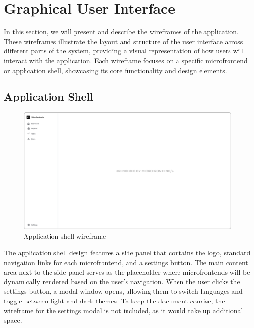 \section{Graphical User Interface}
In this section, we will present and describe the wireframes of the application. These wireframes illustrate the layout and structure of the user interface across different parts of the system, providing a visual representation of how users will interact with the application. Each wireframe focuses on a specific microfrontend or application shell, showcasing its core functionality and design elements.
\subsection{Application Shell}
\begin{figure}[h]
\centerline{\includegraphics[width=1\textwidth]{images/wireframes/shell.png}}
\caption[Application shell wireframe]{Application shell wireframe}
\label{shell:wireframe}
\end{figure}
The application shell design features a side panel that contains the logo, standard navigation links for each microfrontend, and a settings button. The main content area next to the side panel serves as the placeholder where microfrontends will be dynamically rendered based on the user's navigation. When the user clicks the settings button, a modal window opens, allowing them to switch languages and toggle between light and dark themes. To keep the document concise, the wireframe for the settings modal is not included, as it would take up additional space.

